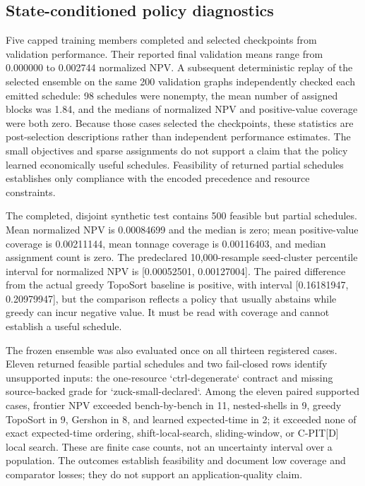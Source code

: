 \documentclass[11pt]{article}
\begin{document}
\subsection{State-conditioned policy diagnostics}
\label{sec:frontier-results}
Five capped training members completed and selected checkpoints from validation performance. Their reported final validation means range from 0.000000 to 0.002744 normalized NPV. A subsequent deterministic replay of the selected ensemble on the same 200 validation graphs independently checked each emitted schedule: 98 schedules were nonempty, the mean number of assigned blocks was 1.84, and the medians of normalized NPV and positive-value coverage were both zero. Because those cases selected the checkpoints, these statistics are post-selection descriptions rather than independent performance estimates. The small objectives and sparse assignments do not support a claim that the policy learned economically useful schedules. Feasibility of returned partial schedules establishes only compliance with the encoded precedence and resource constraints.

The completed, disjoint synthetic test contains 500 feasible but partial schedules. Mean normalized NPV is 0.00084699 and the median is zero; mean positive-value coverage is 0.00211144, mean tonnage coverage is 0.00116403, and median assignment count is zero. The predeclared 10,000-resample seed-cluster percentile interval for normalized NPV is [0.00052501, 0.00127004]. The paired difference from the actual greedy TopoSort baseline is positive, with interval [0.16181947, 0.20979947], but the comparison reflects a policy that usually abstains while greedy can incur negative value. It must be read with coverage and cannot establish a useful schedule.

The frozen ensemble was also evaluated once on all thirteen registered cases. Eleven returned feasible partial schedules and two fail-closed rows identify unsupported inputs: the one-resource `ctrl-degenerate` contract and missing source-backed grade for `zuck-small-declared`. Among the eleven paired supported cases, frontier NPV exceeded bench-by-bench in 11, nested-shells in 9, greedy TopoSort in 9, Gershon in 8, and learned expected-time in 2; it exceeded none of exact expected-time ordering, shift-local-search, sliding-window, or C-PIT[D] local search. These are finite case counts, not an uncertainty interval over a population. The outcomes establish feasibility and document low coverage and comparator losses; they do not support an application-quality claim.
\clearpage

\clearpage

\end{document}
